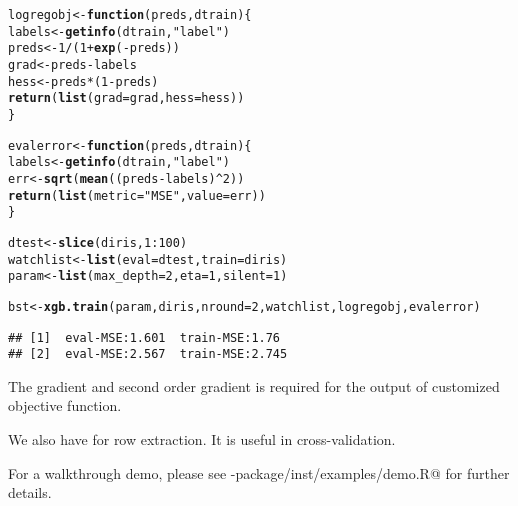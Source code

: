 \documentclass{article}\usepackage[]{graphicx}\usepackage[]{color}
\makeatletter
\newcommand{\hlnum}[1]{\textcolor[rgb]{0.686,0.059,0.569}{#1}}%
\newcommand{\hlstr}[1]{\textcolor[rgb]{0.192,0.494,0.8}{#1}}%
\newcommand{\hlopt}[1]{\textcolor[rgb]{0,0,0}{#1}}%
\newcommand{\hlstd}[1]{\textcolor[rgb]{0.345,0.345,0.345}{#1}}%
\newcommand{\hlkwa}[1]{\textcolor[rgb]{0.161,0.373,0.58}{\textbf{#1}}}%
\newcommand{\hlkwb}[1]{\textcolor[rgb]{0.69,0.353,0.396}{#1}}%
\newcommand{\hlkwc}[1]{\textcolor[rgb]{0.333,0.667,0.333}{#1}}%
\newcommand{\hlkwd}[1]{\textcolor[rgb]{0.737,0.353,0.396}{\textbf{#1}}}%
\newenvironment{kframe}{%
 \def\at@end@of@kframe{}%
 \ifinner\ifhmode%
  \def\at@end@of@kframe{\end{minipage}}%
  \begin{minipage}{\columnwidth}%
 \fi\fi%
 \def\FrameCommand##1{\hskip\@totalleftmargin \hskip-\fboxsep
 \colorbox{shadecolor}{##1}\hskip-\fboxsep
     \hskip-\linewidth \hskip-\@totalleftmargin \hskip\columnwidth}%
 \MakeFramed {\advance\hsize-\width
   \@totalleftmargin\z@ \linewidth\hsize
   \@setminipage}}%
 {\par\unskip\endMakeFramed%
 \at@end@of@kframe}
\newenvironment{knitrout}{}{} %
\makeatother
\begin{document}
\begin{knitrout}
\color{fgcolor}\begin{kframe}
\begin{alltt}
\hlstd{logregobj} \hlkwb{<-} \hlkwa{function}\hlstd{(}\hlkwc{preds}\hlstd{,} \hlkwc{dtrain}\hlstd{) \{}
   \hlstd{labels} \hlkwb{<-} \hlkwd{getinfo}\hlstd{(dtrain,} \hlstr{"label"}\hlstd{)}
   \hlstd{preds} \hlkwb{<-} \hlnum{1}\hlopt{/}\hlstd{(}\hlnum{1} \hlopt{+} \hlkwd{exp}\hlstd{(}\hlopt{-}\hlstd{preds))}
   \hlstd{grad} \hlkwb{<-} \hlstd{preds} \hlopt{-} \hlstd{labels}
   \hlstd{hess} \hlkwb{<-} \hlstd{preds} \hlopt{*} \hlstd{(}\hlnum{1} \hlopt{-} \hlstd{preds)}
   \hlkwd{return}\hlstd{(}\hlkwd{list}\hlstd{(}\hlkwc{grad} \hlstd{= grad,} \hlkwc{hess} \hlstd{= hess))}
\hlstd{\}}

\hlstd{evalerror} \hlkwb{<-} \hlkwa{function}\hlstd{(}\hlkwc{preds}\hlstd{,} \hlkwc{dtrain}\hlstd{) \{}
  \hlstd{labels} \hlkwb{<-} \hlkwd{getinfo}\hlstd{(dtrain,} \hlstr{"label"}\hlstd{)}
  \hlstd{err} \hlkwb{<-} \hlkwd{sqrt}\hlstd{(}\hlkwd{mean}\hlstd{((preds}\hlopt{-}\hlstd{labels)}\hlopt{^}\hlnum{2}\hlstd{))}
  \hlkwd{return}\hlstd{(}\hlkwd{list}\hlstd{(}\hlkwc{metric} \hlstd{=} \hlstr{"MSE"}\hlstd{,} \hlkwc{value} \hlstd{= err))}
\hlstd{\}}

\hlstd{dtest} \hlkwb{<-} \hlkwd{slice}\hlstd{(diris,}\hlnum{1}\hlopt{:}\hlnum{100}\hlstd{)}
\hlstd{watchlist} \hlkwb{<-} \hlkwd{list}\hlstd{(}\hlkwc{eval} \hlstd{= dtest,} \hlkwc{train} \hlstd{= diris)}
\hlstd{param} \hlkwb{<-} \hlkwd{list}\hlstd{(}\hlkwc{max_depth} \hlstd{=} \hlnum{2}\hlstd{,} \hlkwc{eta} \hlstd{=} \hlnum{1}\hlstd{,} \hlkwc{silent} \hlstd{=} \hlnum{1}\hlstd{)}

\hlstd{bst} \hlkwb{<-} \hlkwd{xgb.train}\hlstd{(param, diris,} \hlkwc{nround} \hlstd{=} \hlnum{2}\hlstd{, watchlist, logregobj, evalerror)}
\end{alltt}
\begin{verbatim}
## [1]	eval-MSE:1.601	train-MSE:1.76
## [2]	eval-MSE:2.567	train-MSE:2.745
\end{verbatim}
\end{kframe}
\end{knitrout}

The gradient and second order gradient is required for the output of customized 
objective function. 

We also have \verb@slice@ for row extraction. It is useful in 
cross-validation.

For a walkthrough demo, please see \verb@R-package/inst/examples/demo.R@ for further 
details.
\end{document}
